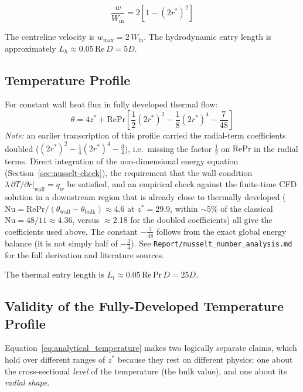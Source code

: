 \documentclass[12pt,a4paper]{article}
\newcommand{\Rey}{\text{Re}}
\newcommand{\Pran}{\text{Pr}}
\begin{document}
\begin{equation}
    \frac{w}{W_{\text{in}}} = 2\left[1 - (2r^*)^2\right]
    \label{eq:analytical_velocity}
\end{equation}

The centreline velocity is $w_{\max} = 2\,W_{\text{in}}$.
The hydrodynamic entry length is approximately $L_h \approx 0.05\,\Rey\,D = 5D$.

\subsection{Temperature Profile}

For constant wall heat flux in fully developed thermal flow:
\begin{equation}
    \theta = 4z^* + \Rey\Pran\left[\frac{1}{2}(2r^*)^2 - \frac{1}{8}(2r^*)^4 - \frac{7}{48}\right]
    \label{eq:analytical_temperature}
\end{equation}
\emph{Note:} an earlier transcription of this profile carried the radial-term coefficients
doubled ($(2r^*)^2 - \frac14(2r^*)^4 - \frac34$), i.e.\ missing the factor $\tfrac12$ on
$\Rey\Pran$ in the radial terms. Direct integration of the non-dimensional energy equation
(Section~\ref{sec:nusselt-check}), the requirement that the wall condition
$\lambda\,\partial T/\partial r|_{\text{wall}}=q_w$ be satisfied, and an empirical check against
the finite-time CFD solution in a downstream region that is already close to thermally developed
($\text{Nu}=\Rey\Pran/(\theta_{\text{wall}}-\theta_{\text{bulk}}) \approx 4.6$ at $z^*=29.9$,
within $\sim$5\% of the classical $\text{Nu}=48/11\approx4.36$, versus $\approx$2.18 for the
doubled coefficients) all give the coefficients used above. The constant $-\tfrac{7}{48}$
follows from the exact global energy balance (it is not simply half of $-\tfrac34$). See
\texttt{Report/nusselt\_number\_analysis.md} for the full derivation and literature sources.

The thermal entry length is $L_t \approx 0.05\,\Rey\,\Pran\,D = 25D$.

\subsection{Validity of the Fully-Developed Temperature Profile}
\label{sec:fd-validity}

Equation~\eqref{eq:analytical_temperature} makes two logically separate claims, which hold over
different ranges of $z^*$ because they rest on different physics: one about the
cross-sectional \emph{level} of the temperature (the bulk value), and one about its \emph{radial
shape}.
\end{document}
